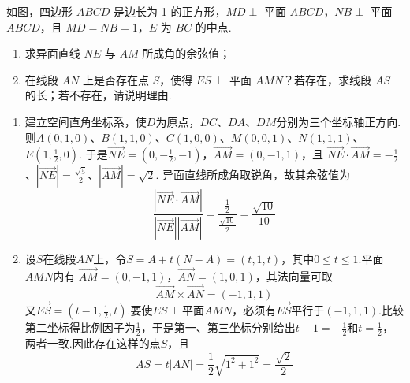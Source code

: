 \begin{problem}
如图，四边形 \(ABCD\) 是边长为 1 的正方形，\(MD \perp\) 平面 \(ABCD\)，\(NB \perp\) 平面 \(ABCD\)，且 \(MD = NB = 1\)，\(E\) 为 \(BC\) 的中点.

\begin{enumerate}
\item 求异面直线 \(NE\) 与 \(AM\) 所成角的余弦值；
\item 在线段 \(AN\) 上是否存在点 \(S\)，使得 \(ES \perp\) 平面 \(AMN\)？若存在，求线段 \(AS\) 的长；若不存在，请说明理由.
\end{enumerate}

\begin{solution}
\begin{enumerate}
\item 建立空间直角坐标系，使\(D\)为原点，\(DC\)、\(DA\)、\(DM\)分别为三个坐标轴正方向.则\(A(0,1,0)\)、\(B(1,1,0)\)、\(C(1,0,0)\)、\(M(0,0,1)\)、\(N(1,1,1)\)、\(E\left(1,\frac{1}{2},0\right)\).
于是\(\overrightarrow{NE}=\left(0,-\frac{1}{2},-1\right)\)，\(\overrightarrow{AM}=(0,-1,1)\)，且
\(\overrightarrow{NE}\cdot\overrightarrow{AM}=-\frac{1}{2}\)、\(|\overrightarrow{NE}|=\frac{\sqrt{5}}{2}\)、\(|\overrightarrow{AM}|=\sqrt{2}\).
异面直线所成角取锐角，故其余弦值为
\[
\frac{|\overrightarrow{NE}\cdot\overrightarrow{AM}|}{|\overrightarrow{NE}||\overrightarrow{AM}|}
=\frac{\frac{1}{2}}{\frac{\sqrt{10}}{2}}=\frac{\sqrt{10}}{10}
\]

\item 设\(S\)在线段\(AN\)上，令\(S=A+t(N-A)=(t,1,t)\)，其中\(0\leqslant t\leqslant1\).平面\(AMN\)内有
\(\overrightarrow{AM}=(0,-1,1)\)，\(\overrightarrow{AN}=(1,0,1)\)，其法向量可取
\[
\overrightarrow{AM}\times\overrightarrow{AN}=(-1,1,1)
\]
又\(\overrightarrow{ES}=\left(t-1,\frac{1}{2},t\right)\).要使\(ES\perp\)平面\(AMN\)，必须有\(\overrightarrow{ES}\)平行于\((-1,1,1)\).比较第二坐标得比例因子为\(\frac{1}{2}\)，于是第一、第三坐标分别给出\(t-1=-\frac{1}{2}\)和\(t=\frac{1}{2}\)，两者一致.因此存在这样的点\(S\)，且
\[
AS=t|AN|=\frac{1}{2}\sqrt{1^2+1^2}=\frac{\sqrt{2}}{2}
\]
\end{enumerate}
\end{solution}
\end{problem}

